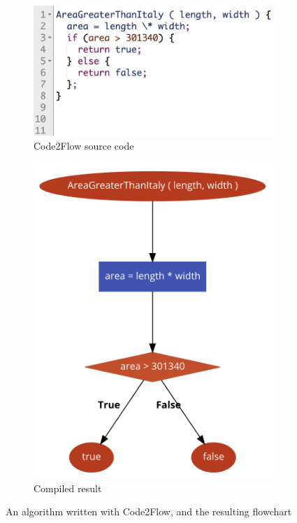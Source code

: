 \begin{figure}[ht]
\centering
\begin{subfigure}{.5\textwidth}
  \centering
  \includegraphics[width=1\linewidth]{assets/c2f_c.png}
  \caption{Code2Flow source code}
  \label{fig:c2f_code}
\end{subfigure}%
\begin{subfigure}{.3\textwidth}
  \centering
  \includegraphics[width=1\linewidth]{assets/c2f_r.png}
  \caption{Compiled result}
  \label{fig:c2f_result}
\end{subfigure}
\caption{An algorithm written with Code2Flow, and the resulting flowchart}
\label{fig:AGTI_IBP}
\end{figure}

